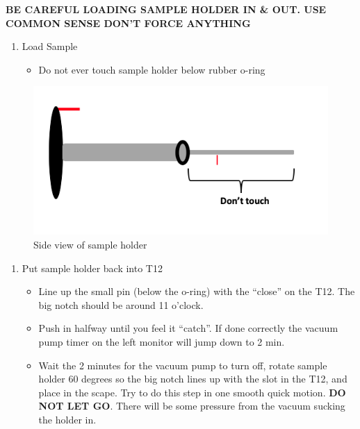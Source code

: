 \documentclass[]{book}
\providecommand{\tightlist}{%
  \setlength{\itemsep}{0pt}\setlength{\parskip}{0pt}}
\begin{document}
\textbf{BE CAREFUL LOADING SAMPLE HOLDER IN \& OUT. USE COMMON SENSE DON'T FORCE ANYTHING}

\begin{enumerate}
\def\labelenumi{\arabic{enumi})}
\setcounter{enumi}{4}
\tightlist
\item
  Load Sample

  \begin{itemize}
  \tightlist
  \item
    Do not ever touch sample holder below rubber o-ring
  \end{itemize}
\end{enumerate}

\begin{figure}
\includegraphics[width=7.35in]{images/side_view_holder} \caption{Side view of sample holder}\label{fig:unnamed-chunk-4}
\end{figure}

\begin{enumerate}
\def\labelenumi{\arabic{enumi})}
\setcounter{enumi}{5}
\tightlist
\item
  Put sample holder back into T12

  \begin{itemize}
  \tightlist
  \item
    Line up the small pin (below the o-ring) with the ``close'' on the T12. The big notch
    should be around 11 o'clock.
  \item
    Push in halfway until you feel it ``catch''. If done correctly the vacuum pump timer on the left monitor will jump down to 2 min.
  \item
    Wait the 2 minutes for the vacuum pump to turn off, rotate sample holder 60 degrees so the big notch lines up with the slot in the T12, and place in the scape. Try to do this step in one smooth quick motion. \textbf{DO NOT LET GO}. There will be some pressure from the vacuum sucking the holder in.
  \end{itemize}
\end{enumerate}
\end{document}
